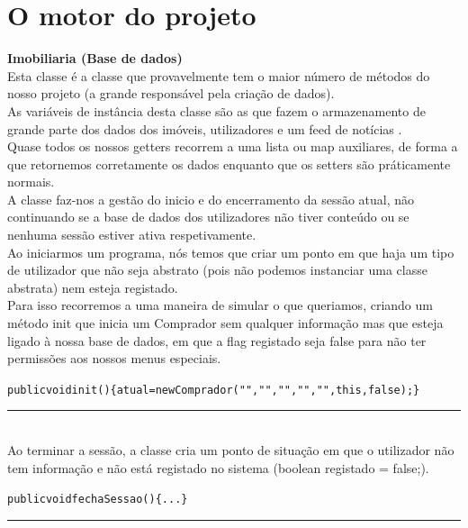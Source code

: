\documentclass[12pt]{article}
\newenvironment{code}                    
{\textbf{
} \hspace{1cm} \hrulefill \\ 
\smallskip 
\begin{center}
\begin{minipage}{0.9\textwidth} 
\begin{alltt}\small}
{\end{alltt}
\end{minipage}
\end{center}
\hrule\smallskip
}
\begin{document}
\pagebreak

\section{O motor do projeto}

\textbf{Imobiliaria (Base de dados)}
\\

Esta classe é a classe que provavelmente tem o maior número de métodos do nosso projeto (a grande responsável pela criação de dados).
\\
As variáveis de instância desta classe são as que fazem o armazenamento de grande parte dos dados dos imóveis, utilizadores e um feed de notícias . 
\\

Quase todos os nossos getters recorrem a uma lista ou map auxiliares, de forma a que retornemos corretamente os dados enquanto que os setters são práticamente normais.
\\

A classe faz-nos a gestão do inicio e do encerramento da sessão atual, não continuando se a base de dados dos utilizadores não tiver conteúdo ou se nenhuma sessão estiver ativa respetivamente.
\\
Ao iniciarmos um programa, nós temos que criar um ponto em que haja um tipo de utilizador que não seja abstrato (pois não podemos instanciar uma classe abstrata) nem esteja registado.\\
Para isso recorremos a uma maneira de simular o que queriamos, criando um método init que inicia um Comprador sem qualquer informação mas que esteja ligado à nossa base de dados, em que a flag registado seja false para não ter permissões aos nossos menus especiais.
\newline
\begin{code}
   public void init()\{atual = new Comprador ("","","","","",this,false);\}
\end{code}
~\\
Ao terminar a sessão, a classe cria um ponto de situação em que o utilizador não tem informação e não está registado no sistema (boolean registado = false;).
\newline
\begin{code}
public void fechaSessao()\{... \}
\end{code}
~\\
\end{document}
